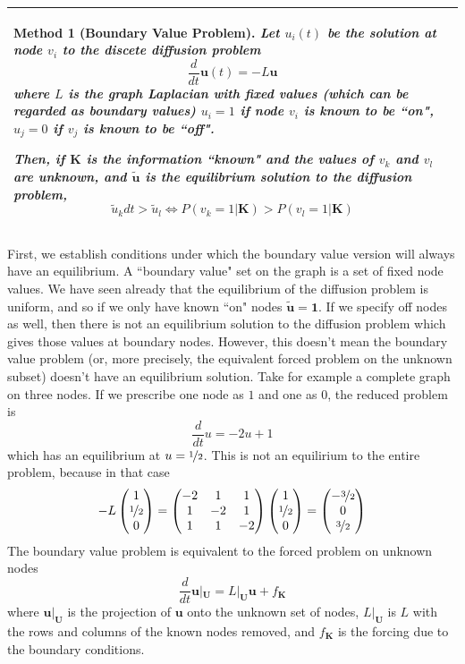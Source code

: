 \documentclass[10pt]{article}
\newtheorem{method}{Method}
\theoremstyle{definition}
\numberwithin{theorem}{section}
\numberwithin{definition}{section}
\numberwithin{lemma}{section}
\numberwithin{corollary}{section}
\numberwithin{clm}{section}
\numberwithin{rmk}{section}
\newenvironment{inbox2}
{\begin{center}
		\begin{tabular}{|p{0.9\textwidth}|}
			\hline \vspace{-0.5 cm}
		}
		{ 
			\\ \hline
		\end{tabular} 
	\end{center}
}
\newcommand{\nhalf}{\nicefrac{1}{2}}
\renewcommand{\b}{\bm}
\begin{document}
\begin{inbox2}
	\begin{method}[Boundary Value Problem]\label{boundarVal}
Let $u_i(t)$ be the solution at node $v_i$ to the discete diffusion problem
\[
\frac{d}{dt}\b{u}(t)  = - L\b{u}
\]
where $L$ is the  graph Laplacian with fixed values (which can be regarded as boundary values) $u_i = 1$ if node $v_i$ is known to be ``on", $u_j = 0$ if $v_j$ is known to be ``off". 

Then, if $\b{K}$ is the information ``known" and the values of $v_{k}$ and $v_{l}$ are unknown, and $\b{\tilde{u}}$ is the equilibrium solution to the diffusion problem,
\[
\tilde{u}_k dt >  \tilde{u}_l \Leftrightarrow  P(v_k=  1|\b{K}) > P(v_l = 1|\b{K})
\]
	\end{method}
\end{inbox2}

First, we establish conditions under which the boundary value version will always have an equilibrium. A ``boundary value" set on the graph is a set of fixed node values. We have seen already that the equilibrium of the diffusion problem is uniform, and so if we only have known ``on" nodes $\b{\tilde{u}} = \b{1}$.  If we specify off nodes as well, then there is not an equilibrium solution to the diffusion problem which gives those values at boundary nodes. However, this doesn't mean the boundary value problem (or, more precisely, the equivalent forced problem on the unknown subset) doesn't have an equilibrium solution. Take for example a complete graph on three nodes. If we prescribe one node as $1$ and one as $0$, the reduced problem is
\[
\frac{d}{dt} u = -2u + 1
\]
which has an equilibrium at $u = \nhalf$. This is not an equilirium to the entire problem, because in that case
\[
-L\begin{pmatrix}
1 \\ \nhalf \\ 0
\end{pmatrix} = \begin{pmatrix}
-2 & 1 & 1\\ 1 & -2 & 1 \\ 1 & 1 & -2
\end{pmatrix}\begin{pmatrix}
1 \\ \nhalf \\ 0
\end{pmatrix} = \begin{pmatrix}
-\nicefrac{3}{2} \\ 0 \\ \nicefrac{3}{2}
\end{pmatrix}
\]
The boundary value problem is equivalent to the forced problem on unknown nodes
\[
\frac{d}{dt}\b{u}|_{\b{U}} = L|_{\b{U}}\b{u} + f_{\b{K}}
\]
where $\b{u}|_{\b{U}}$ is the projection of $\b{u}$ onto the unknown set of nodes, $L|_{\b{U}}$ is $L$ with the rows and columns of the known nodes removed, and $f_{\b{K}}$ is the forcing due to the boundary conditions.
	
\end{document}
